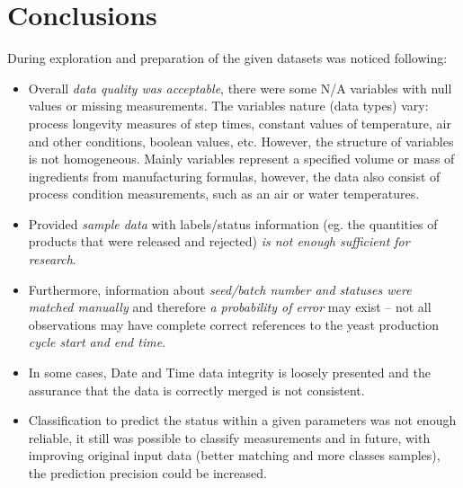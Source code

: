 \section{Conclusions}
During exploration and preparation of the given datasets was noticed following:
\begin{itemize}
    \item Overall \emph{data quality was acceptable}, there were some N/A variables with null values or missing measurements. The variables nature (data types) vary: process longevity measures of step times, constant values of temperature, air and other conditions, boolean values, etc. However, the structure of variables is not homogeneous. Mainly variables represent a specified volume or mass of ingredients from manufacturing formulas, however, the data also consist of process condition measurements, such as an air or water temperatures.
    
    \item Provided \emph{sample data} with labels/status information (eg. the quantities of products that were released and rejected) \emph{is not enough sufficient for research}. 
    
    \item Furthermore, information about \emph{seed/batch number and statuses were \\ matched manually} and therefore \emph{a probability of error} may exist – not all observations may have complete correct references to the yeast production \emph{cycle start and end time}.
    
    \item In some cases, Date and Time data integrity is loosely presented and the assurance that the data is correctly merged is not consistent.
    
    \item Classification to predict the status within a given parameters was not enough reliable, it still was possible to classify measurements and in future, with improving original input data (better matching and more classes samples), the prediction precision could be increased.  
\end{itemize}